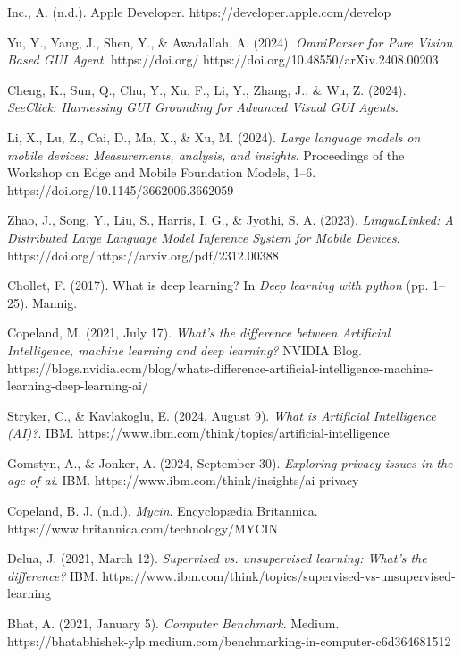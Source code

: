 \documentclass[licencjacka,en]{pracamgr}
\begin{document}
\begin{thebibliography}{99}
Inc., A. (n.d.). Apple Developer. https://developer.apple.com/develop 

Yu, Y., Yang, J., Shen, Y., \& Awadallah, A. (2024). \textit{OmniParser for Pure Vision Based GUI Agent}. https://doi.org/ https://doi.org/10.48550/arXiv.2408.00203 

Cheng, K., Sun, Q., Chu, Y., Xu, F., Li, Y., Zhang, J., \& Wu, Z. (2024). \textit{SeeClick: Harnessing GUI Grounding for Advanced Visual GUI Agents}. 

Li, X., Lu, Z., Cai, D., Ma, X., \& Xu, M. (2024). \textit{Large language models on mobile devices: Measurements, analysis, and insights}. Proceedings of the Workshop on Edge and Mobile Foundation Models, 1–6. https://doi.org/10.1145/3662006.3662059 

Zhao, J., Song, Y.,  Liu, S., Harris, I. G., \& Jyothi, S. A. (2023). \textit{LinguaLinked: A Distributed Large Language Model Inference System for Mobile Devices}. https://doi.org/https://arxiv.org/pdf/2312.00388 

Chollet, F. (2017). What is deep learning? In \textit{Deep learning with python} (pp. 1–25). Mannig. 

Copeland, M. (2021, July 17). \textit{What’s the difference between Artificial Intelligence, machine learning and deep learning?} NVIDIA Blog. https://blogs.nvidia.com/blog/whats-difference-artificial-intelligence-machine-learning-deep-learning-ai/ 

Stryker, C., \& Kavlakoglu, E. (2024, August 9). \textit{What is Artificial Intelligence (AI)?}. IBM. https://www.ibm.com/think/topics/artificial-intelligence 

Gomstyn, A., \& Jonker, A. (2024, September 30). \textit{Exploring privacy issues in the age of ai}. IBM. https://www.ibm.com/think/insights/ai-privacy 

Copeland, B. J. (n.d.). \textit{Mycin}. Encyclopædia Britannica. https://www.britannica.com/technology/MYCIN 

Delua, J. (2021, March 12). \textit{Supervised vs. unsupervised learning: What’s the difference?} IBM. https://www.ibm.com/think/topics/supervised-vs-unsupervised-learning 

Bhat, A. (2021, January 5). \textit{Computer Benchmark}. Medium. https://bhatabhishek-ylp.medium.com/benchmarking-in-computer-c6d364681512 


\end{thebibliography}
\end{document}
